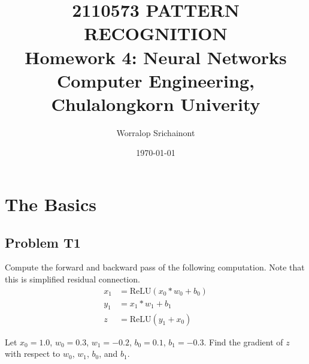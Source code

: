 \documentclass[12pt, a4paper]{article}
\title {
	\textbf{2110573 PATTERN RECOGNITION} \\
    \vspace{1em}
	\Large{\textbf{Homework 4: Neural Networks}} \\
    \vspace{0.5em}
    \large{Computer Engineering, Chulalongkorn Univerity}
}
\author{Worralop Srichainont}
\date{\today}
\begin{document}
    \maketitle
    \thispagestyle{empty}
    \clearpage

    \tableofcontents
    \thispagestyle{empty}
    \clearpage


    \section{The Basics}
        \subsection{Problem T1}
            Compute the forward and backward pass of the following computation. Note that this is simplified residual connection.
            \begin{align*}
                {x}_{1} &= \text{ReLU}({x}_{0} \ast {w}_{0} + {b}_{0}) \\
                {y}_{1} &= {x}_{1} \ast {w}_{1} + {b}_{1} \\
                z &= \text{ReLU}({y}_{1} + {x}_{0})
            \end{align*}

            Let $x_0 = 1.0$, $w_0 = 0.3$, $w_1 = -0.2$, $b_0 = 0.1$, $b_1 = -0.3$. Find the gradient of $z$ with respect to $w_0$, $w_1$, $b_0$, and $b_1$.
\end{document}
